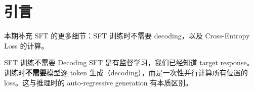 \section{引言}
本期补充 SFT 的更多细节：SFT 训练时不需要 decoding，以及 Cross-Entropy Loss 的计算。

\begin{importantbox}{SFT 训练不需要 Decoding}
SFT 是有监督学习，我们已经知道 target response。训练时\textbf{不需要}模型逐 token 生成（decoding），而是一次性并行计算所有位置的 loss。这与推理时的 auto-regressive generation 有本质区别。
\end{importantbox}

